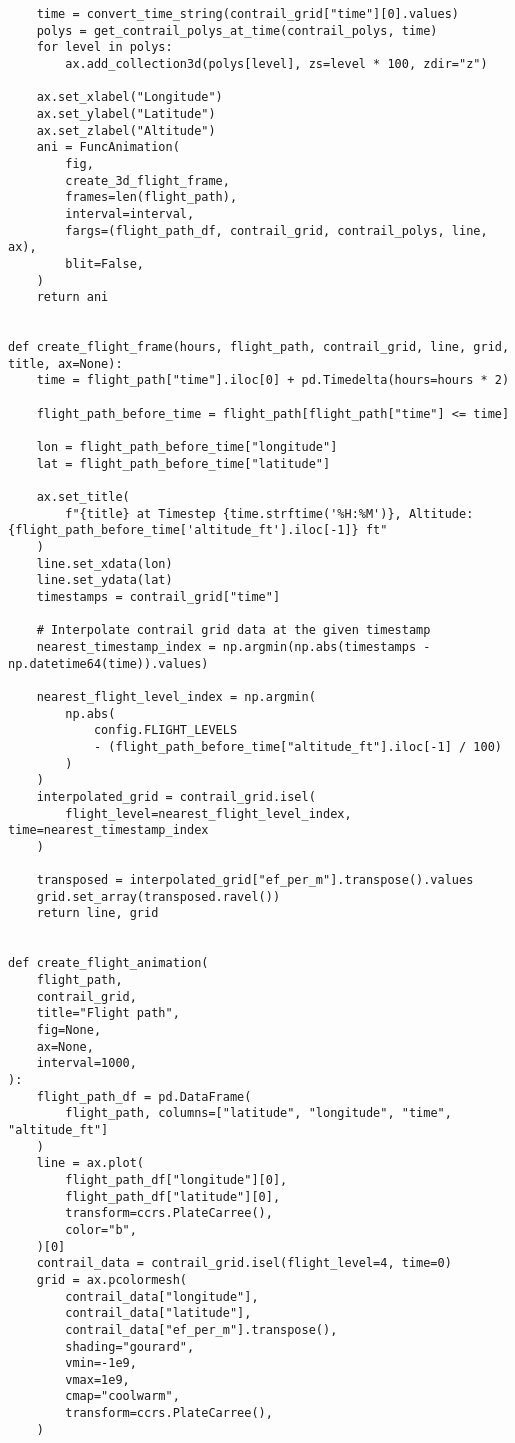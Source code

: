\begin{verbatim}
    time = convert_time_string(contrail_grid["time"][0].values)
    polys = get_contrail_polys_at_time(contrail_polys, time)
    for level in polys:
        ax.add_collection3d(polys[level], zs=level * 100, zdir="z")

    ax.set_xlabel("Longitude")
    ax.set_ylabel("Latitude")
    ax.set_zlabel("Altitude")
    ani = FuncAnimation(
        fig,
        create_3d_flight_frame,
        frames=len(flight_path),
        interval=interval,
        fargs=(flight_path_df, contrail_grid, contrail_polys, line, ax),
        blit=False,
    )
    return ani


def create_flight_frame(hours, flight_path, contrail_grid, line, grid, title, ax=None):
    time = flight_path["time"].iloc[0] + pd.Timedelta(hours=hours * 2)

    flight_path_before_time = flight_path[flight_path["time"] <= time]

    lon = flight_path_before_time["longitude"]
    lat = flight_path_before_time["latitude"]

    ax.set_title(
        f"{title} at Timestep {time.strftime('%H:%M')}, Altitude: {flight_path_before_time['altitude_ft'].iloc[-1]} ft"
    )
    line.set_xdata(lon)
    line.set_ydata(lat)
    timestamps = contrail_grid["time"]

    # Interpolate contrail grid data at the given timestamp
    nearest_timestamp_index = np.argmin(np.abs(timestamps - np.datetime64(time)).values)

    nearest_flight_level_index = np.argmin(
        np.abs(
            config.FLIGHT_LEVELS
            - (flight_path_before_time["altitude_ft"].iloc[-1] / 100)
        )
    )
    interpolated_grid = contrail_grid.isel(
        flight_level=nearest_flight_level_index, time=nearest_timestamp_index
    )

    transposed = interpolated_grid["ef_per_m"].transpose().values
    grid.set_array(transposed.ravel())
    return line, grid


def create_flight_animation(
    flight_path,
    contrail_grid,
    title="Flight path",
    fig=None,
    ax=None,
    interval=1000,
):
    flight_path_df = pd.DataFrame(
        flight_path, columns=["latitude", "longitude", "time", "altitude_ft"]
    )
    line = ax.plot(
        flight_path_df["longitude"][0],
        flight_path_df["latitude"][0],
        transform=ccrs.PlateCarree(),
        color="b",
    )[0]
    contrail_data = contrail_grid.isel(flight_level=4, time=0)
    grid = ax.pcolormesh(
        contrail_data["longitude"],
        contrail_data["latitude"],
        contrail_data["ef_per_m"].transpose(),
        shading="gourard",
        vmin=-1e9,
        vmax=1e9,
        cmap="coolwarm",
        transform=ccrs.PlateCarree(),
    )


\end{verbatim}
